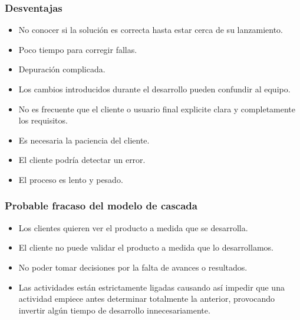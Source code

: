 	\subsubsection{Desventajas}
	\begin{itemize}
		\item No conocer si la soluci\'on es correcta hasta estar cerca de su lanzamiento.
		\item Poco tiempo para corregir fallas.
		\item Depuraci\'on complicada.
		\item Los cambios introducidos durante el desarrollo pueden confundir al equipo.
		\item No es frecuente que el cliente o usuario final explicite clara y completamente los requisitos.
		\item Es necesaria la paciencia del cliente.
		\item El cliente podr\'ia detectar un error.
		\item El proceso es lento y pesado.
	\end{itemize}

	\subsubsection{Probable fracaso del modelo de cascada}
	\begin{itemize}
		\item Los clientes quieren ver el producto a medida que se desarrolla.
		\item El cliente no puede validar el producto a medida que lo desarrollamos.
		\item No poder tomar decisiones por la falta de avances o resultados.
		\item Las actividades est\'an estrictamente ligadas causando as\'i impedir que una actividad empiece antes determinar totalmente la anterior, provocando invertir alg\'un tiempo de desarrollo innecesariamente.
	\end{itemize}

